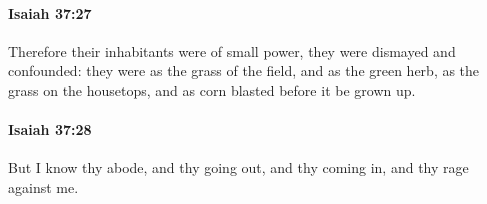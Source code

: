 		\paragraph{Isaiah 37:27} %
			\label{ISAIAH-37-27}

			Therefore their inhabitants were of small power, they were dismayed and confounded: they were as the grass of the field, and as the green herb, as the grass on the housetops, and as corn blasted before it be grown up.


		\paragraph{Isaiah 37:28} %
			\label{ISAIAH-37-28}

			But I know thy abode, and thy going out, and thy coming in, and thy rage against me.


